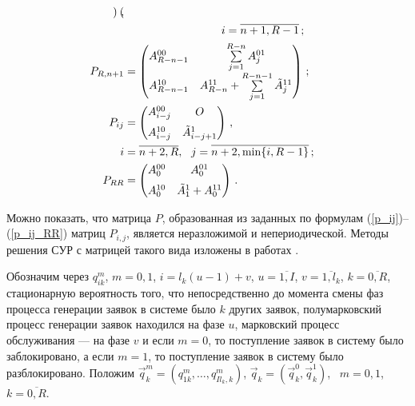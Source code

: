 \begin{multicols}{2}
\begin{align}
\begin{pmatrix}
\end{pmatrix}\,,\notag\\
&\ \ \ \ \ \ \ \ \ \hspace*{20mm} i=\overline{n+1,R-1}\,;\\
P_{R,n+1} &=
\begin{pmatrix}
A^{00}_{R-n-1} & \sum\limits_{j=1}^{R-n} A^{01}_{j}\\[6pt]
A^{10}_{R-n-1} & A^{11}_{R-n} + \sum\limits_{j=1}^{R-n-1} \Tilde A^{11}_{j}\\
\end{pmatrix}\,;
\\
P_{ij} &=
\begin{pmatrix}
A^{00}_{i-j} & O \\[6pt]
A^{10}_{i-j} & \Tilde A^{1}_{i-j+1} \\
\end{pmatrix}\,,\notag \\ 
 i&=\overline{n+2,R}, \ \ j=\overline{n+2,\min\{i,R-1\}}\,;
\\
P_{RR} &=
\begin{pmatrix}
A^{00}_{0} & A^{01}_{0}\\[6pt]
A^{10}_{0} & \Tilde A^{1}_{1}+A^{11}_{0}\\
\end{pmatrix}\,. \label{p_ij_RR}
\end{align}

Можно показать, что матрица $P$, образованная из
заданных по формулам (\ref{p_ij})--(\ref{p_ij_RR}) матриц $P_{i,j}$,
является неразложимой и непериодической.
Методы решения СУР с матрицей такого вида изложены в работах \cite{BDPS03,BDPS04}.


Обозначим через
$q^m_{ik}$, $m=0,1$, $i=l_k(u-1)+v$, $u=\overline{1,I}$, $v=\overline{1,l_k}$, $k=\overline{0,R}$,
стационарную вероятность того, что непосредственно до момента смены фаз процесса генерации заявок
в системе было $k$ других заявок,
полумарковский процесс генерации заявок находился на фазе $u$,
марковский процесс обслуживания --- на фазе $v$ и если $m=0$, то поступление заявок в систему было заблокировано,
а если $m=1$, то поступление заявок в систему было разблокировано.
Положим $\vec{q}^{m}_k=(q^{m}_{1k},\ldots,q^{m}_{Il_k,k})$,
$\vec{q}_k = (\vec{q}^0_k,\vec{q}^1_k)$, \ $m=0,1$, \ $k=\overline{0,R}$.


\end{multicols}

